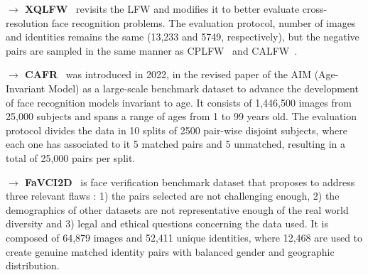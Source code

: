 \documentclass[class=report, crop=false, a4paper, 12pt]{standalone}
\begin{document}
\begin{appendix}
\vspace{0.7\baselineskip}
\noindent\textbf{$\rightarrow$ XQLFW}~\autocite{knocheCrossQualityLFWDatabase2021} revisits the LFW and modifies it to better evaluate cross-resolution face recognition problems. The evaluation protocol, number of images and identities remains the same (13,233 and 5749, respectively), but the negative pairs are sampled in the same manner as CPLFW~\autocite{zhengCrossPoseLFWDatabase} and CALFW~\autocite{zhengCrossAgeLFWDatabase2017}.

\vspace{0.7\baselineskip}
\noindent\textbf{$\rightarrow$ CAFR}~\autocite{zhaoAgeInvariantFaceRecognition2022} was introduced in 2022, in the revised paper of the AIM (Age-Invariant Model) as a large-scale benchmark dataset to advance the development of face recognition models invariant to age. It consists of 1,446,500 images from 25,000 subjects and spans a range of ages from 1 to 99 years old. The evaluation protocol divides the data in 10 splits of 2500 pair-wise disjoint subjects, where each one has associated to it 5 matched pairs and 5 unmatched, resulting in a total of 25,000 pairs per split.

\vspace{0.7\baselineskip}
\noindent\textbf{$\rightarrow$ FaVCI2D}~\autocite{popescuFaceVerificationChallenging2022} is face verification benchmark dataset that proposes to address three relevant flaws : 1) the pairs selected are not challenging enough,  2) the demographics of other datasets are not representative enough of the real world diversity and 3) legal and ethical questions concerning the data used. It is composed of 64,879 images and 52,411 unique identities, where 12,468 are used to create genuine matched identity pairs with balanced gender and geographic distribution.




\end{appendix}
\end{document}
